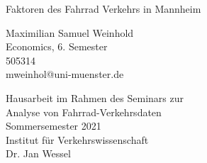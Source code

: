 \documentclass[a4paper,12pt]{thesis}
\begin{document}

\begin{center}								%
	\begin{LARGE}								%
		Faktoren des Fahrrad Verkehrs in Mannheim						%
	\end{LARGE}								%
	
	\vspace{\fill}								%
	
	\begin{large}								%
		Maximilian Samuel Weinhold\\					%
		Economics, 6. Semester\\
		505314\\
		mweinhol@uni-muenster.de\\
		
		\vspace{\fill}
		
		Hausarbeit im Rahmen des Seminars zur\\
		Analyse von Fahrrad-Verkehrsdaten\\
		Sommersemester 2021\\
		Institut für Verkehrswissenschaft\\
		Dr. Jan Wessel\\
	\end{large}
	
	\thispagestyle{empty}						%
	
\end{center}								%

\newpage									%


\onehalfspacing	
\thispagestyle{empty}	
\tableofcontents
\end{document}
